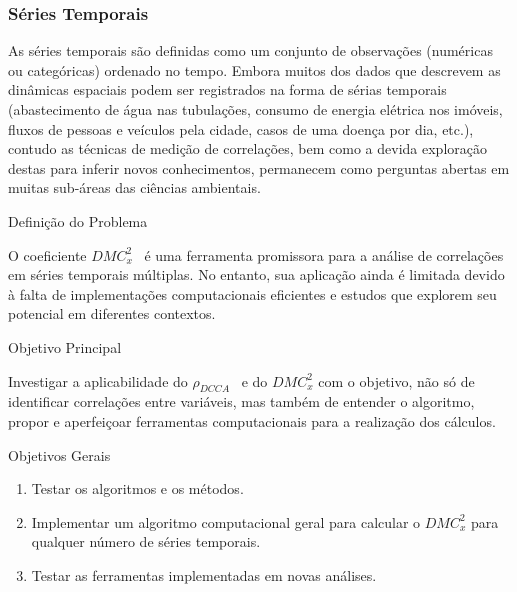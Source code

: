 \documentclass[11pt, aspectratio=169]{beamer}
\newcommand{\dmc}{\(DMC_x^2\) }
\newcommand{\pdcca}{\({\rho}_{DCCA}\) }
\begin{document}
\begin{frame}
  \frametitle{Séries Temporais}

  As séries temporais são definidas como um conjunto de observações (numéricas ou categóricas) ordenado no tempo.  Embora muitos dos dados que descrevem as dinâmicas espaciais podem ser registrados na forma de sérias temporais (abastecimento de água nas tubulações, consumo de energia elétrica nos imóveis, fluxos de pessoas e veículos pela cidade, casos de uma doença por dia, etc.), contudo as técnicas de medição de correlações, bem como a devida exploração destas para inferir novos conhecimentos, permanecem como perguntas abertas em muitas sub-áreas das ciências ambientais\cite{Bermudez-Edo2018}.

\end{frame}

\begin{frame}{Definição do Problema}

  O coeficiente \dmc~é uma ferramenta promissora para a análise de correlações em séries temporais múltiplas. No entanto, sua aplicação ainda é limitada devido à falta de implementações computacionais eficientes e estudos que explorem seu potencial em diferentes contextos.


\end{frame}

\begin{frame}{Objetivo Principal}

  Investigar a aplicabilidade do \pdcca~e do \dmc com o objetivo, não só de identificar correlações entre variáveis, mas também de entender o algoritmo, propor e aperfeiçoar ferramentas computacionais para a realização dos cálculos.


\end{frame}

\begin{frame}{Objetivos Gerais}

\begin{enumerate}
    \label{enum:obj_espec}
    \item  Testar os algoritmos e os métodos.
    \item Implementar um algoritmo computacional geral para calcular o \dmc para qualquer número de séries temporais.
    \item Testar as ferramentas implementadas em novas análises.
\end{enumerate}

\end{frame}
\end{document}
